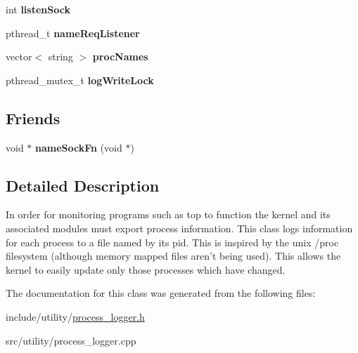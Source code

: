 \begin{DoxyCompactItemize}
\item 
\hypertarget{classcProcessLogger_aa063321bd42515ec4d693e649efeabec}{int {\bfseries listen\-Sock}}\label{db/d63/classcProcessLogger_aa063321bd42515ec4d693e649efeabec}

\item 
\hypertarget{classcProcessLogger_afee58063556c38183fe154a371b3e3c6}{pthread\-\_\-t {\bfseries name\-Req\-Listener}}\label{db/d63/classcProcessLogger_afee58063556c38183fe154a371b3e3c6}

\item 
\hypertarget{classcProcessLogger_a0ad1b192b0b12af6a15d6d447b67fb88}{vector$<$ string $>$ {\bfseries proc\-Names}}\label{db/d63/classcProcessLogger_a0ad1b192b0b12af6a15d6d447b67fb88}

\item 
\hypertarget{classcProcessLogger_a89c957c298d8c515a85567bf1fe82684}{pthread\-\_\-mutex\-\_\-t {\bfseries log\-Write\-Lock}}\label{db/d63/classcProcessLogger_a89c957c298d8c515a85567bf1fe82684}

\end{DoxyCompactItemize}
\subsection*{\-Friends}
\begin{DoxyCompactItemize}
\item 
\hypertarget{classcProcessLogger_a3e64c169e8b917a1c47b39f0db9c7628}{void $\ast$ {\bfseries name\-Sock\-Fn} (void $\ast$)}\label{db/d63/classcProcessLogger_a3e64c169e8b917a1c47b39f0db9c7628}

\end{DoxyCompactItemize}


\subsection{\-Detailed \-Description}
\-In order for monitoring programs such as top to function the kernel and its associated modules must export process information. \-This class logs information for each process to a file named by its pid. \-This is inspired by the unix /proc filesystem (although memory mapped files aren't being used). \-This allows the kernel to easily update only those processes which have changed. 

\-The documentation for this class was generated from the following files\-:\begin{DoxyCompactItemize}
\item 
include/utility/\hyperlink{process__logger_8h}{process\-\_\-logger.\-h}\item 
src/utility/process\-\_\-logger.\-cpp\end{DoxyCompactItemize}
